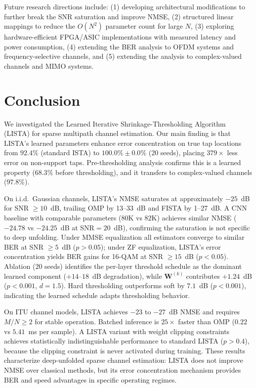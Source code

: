 \documentclass[a4paper,fleqn]{cas-sc}
\begin{document}
Future research directions include: (1) developing architectural modifications to further break the SNR saturation and improve NMSE, (2) structured linear mappings to reduce the $O(N^2)$ parameter count for large $N$, (3) exploring hardware-efficient FPGA/ASIC implementations with measured latency and power consumption, (4) extending the BER analysis to OFDM systems and frequency-selective channels, and (5) extending the analysis to complex-valued channels and MIMO systems.


\section{Conclusion}\label{sec:conclusion}

We investigated the Learned Iterative Shrinkage-Thresholding Algorithm (LISTA) for sparse multipath channel estimation. Our main finding is that LISTA's learned parameters enhance error concentration on true tap locations from $92.4\%$ (standard ISTA) to $100.0\% \pm 0.0\%$ (20 seeds), placing $379\times$ less error on non-support taps. Pre-thresholding analysis confirms this is a learned property ($68.3\%$ before thresholding), and it transfers to complex-valued channels ($97.8\%$).

On i.i.d.~Gaussian channels, LISTA's NMSE saturates at approximately $-25$~dB for SNR $\geq 10$~dB, trailing OMP by 13--33~dB and FISTA by 1--27~dB. A CNN baseline with comparable parameters ($80$K vs $82$K) achieves similar NMSE ($-24.78$ vs $-24.25$~dB at SNR$=20$~dB), confirming the saturation is not specific to deep unfolding. Under MMSE equalization all estimators converge to similar BER at SNR $\geq 5$~dB ($p > 0.05$); under ZF equalization, LISTA's error concentration yields BER gains for 16-QAM at SNR $\geq 15$~dB ($p < 0.05$). Ablation (20 seeds) identifies the per-layer threshold schedule as the dominant learned component ($+14$--$18$~dB degradation), while $\mathbf{W}^{(k)}$ contributes $+1.24$~dB ($p < 0.001$, $d = 1.5$). Hard thresholding outperforms soft by $7.1$~dB ($p < 0.001$), indicating the learned schedule adapts thresholding behavior.

On ITU channel models, LISTA achieves $-23$ to $-27$~dB NMSE and requires $M/N \geq 2$ for stable operation. Batched inference is $25\times$ faster than OMP ($0.22$ vs $5.41$~ms per sample). A LISTA variant with weight clipping constraints achieves statistically indistinguishable performance to standard LISTA ($p > 0.4$), because the clipping constraint is never activated during training. These results characterize deep-unfolded sparse channel estimation: LISTA does not improve NMSE over classical methods, but its error concentration mechanism provides BER and speed advantages in specific operating regimes.
\end{document}
